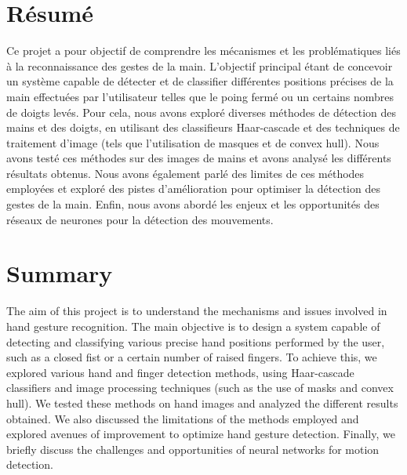 \documentclass[11pt]{article}
\begin{document}
\section*{Résumé}
Ce projet a pour objectif de comprendre les mécanismes et les problématiques liés à la reconnaissance des gestes de la main. L'objectif principal étant de concevoir un système capable de détecter et de classifier différentes positions précises de la main effectuées par l'utilisateur telles que le poing fermé ou un certains nombres de doigts levés. Pour cela, nous avons exploré diverses méthodes de détection des mains et des doigts, en utilisant des classifieurs Haar-cascade et des techniques de traitement d'image (tels que l'utilisation de masques et de convex hull). Nous avons testé ces méthodes sur des images de mains et avons analysé les différents résultats obtenus. Nous avons également parlé des limites de ces méthodes employées et exploré des pistes d'amélioration pour optimiser la détection des gestes de la main. Enfin, nous avons abordé les enjeux et les opportunités des réseaux de neurones pour la détection des mouvements. \bigbreak

\section*{Summary}
The aim of this project is to understand the mechanisms and issues involved in hand gesture recognition. The main objective is to design a system capable of detecting and classifying various precise hand positions performed by the user, such as a closed fist or a certain number of raised fingers. To achieve this, we explored various hand and finger detection methods, using Haar-cascade classifiers and image processing techniques (such as the use of masks and convex hull). We tested these methods on hand images and analyzed the different results obtained. We also discussed the limitations of the methods employed and explored avenues of improvement to optimize hand gesture detection. Finally, we briefly discuss the challenges and opportunities of neural networks for motion detection.
\end{document}
